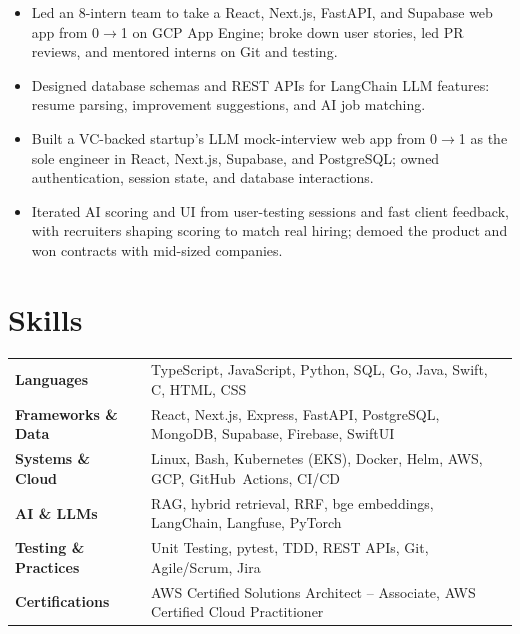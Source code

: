\documentclass[11pt, letterpaper]{article}
\begin{document}
\vspace{1pt}
\begin{itemize}
  \item Led an 8-intern team to take a React, Next.js, FastAPI, and Supabase web app from 0$\to$1 on GCP App Engine; broke down user stories, led PR reviews, and mentored interns on Git and testing.
  \item Designed database schemas and REST APIs for LangChain LLM features: resume parsing, improvement suggestions, and AI job matching.
\end{itemize}

\vspace{1pt}
\begin{itemize}
  \item Built a VC-backed startup's LLM mock-interview web app from 0$\to$1 as the sole engineer in React, Next.js, Supabase, and PostgreSQL; owned authentication, session state, and database interactions.
  \item Iterated AI scoring and UI from user-testing sessions and fast client feedback, with recruiters shaping scoring to match real hiring; demoed the product and won contracts with mid-sized companies.
\end{itemize}

\section{Skills}
\begin{tabularx}{\textwidth}{@{}l @{\hspace{7pt}} >{\raggedright\arraybackslash}X@{}}
  \textbf{Languages} & TypeScript, JavaScript, Python, SQL, Go, Java, Swift, C, HTML, CSS \\[1pt]
  \textbf{Frameworks \& Data} & React, Next.js, Express, FastAPI, PostgreSQL, MongoDB, Supabase, Firebase, SwiftUI \\[1pt]
  \textbf{Systems \& Cloud} & Linux, Bash, Kubernetes (EKS), Docker, Helm, AWS, GCP, GitHub~Actions, CI/CD \\[1pt]
  \textbf{AI \& LLMs} & RAG, hybrid retrieval, RRF, bge embeddings, LangChain, Langfuse, PyTorch \\[1pt]
  \textbf{Testing \& Practices} & Unit Testing, pytest, TDD, REST APIs, Git, Agile/Scrum, Jira \\[1pt]
  \textbf{Certifications} & AWS Certified Solutions Architect -- Associate, AWS Certified Cloud Practitioner \\
\end{tabularx}
\end{document}

